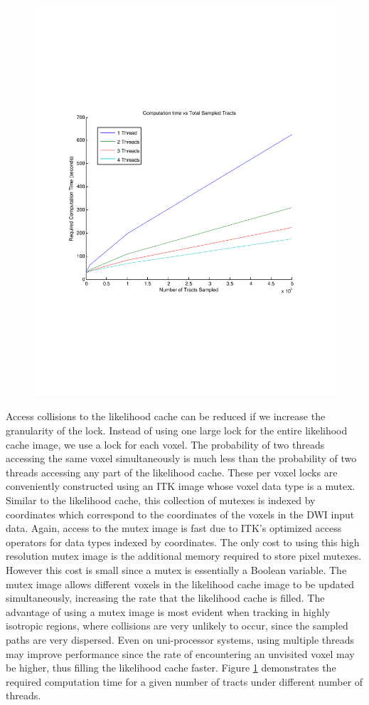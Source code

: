 \documentclass{InsightArticle}
\begin{document}
\begin{figure}
  \center
  \includegraphics[trim = 20mm 70mm 20mm 70mm, clip, width=0.75\linewidth]
	  {timepertracts}
	\label{fig:performance}
\end{figure}

Access collisions to the likelihood cache can be reduced if we increase the granularity of the lock.  Instead of using one large lock for the entire likelihood cache image, we use a lock for each voxel.  The probability of two threads accessing the same voxel simultaneously is much less than the probability of two threads accessing any part of the likelihood cache.  These per voxel locks are conveniently constructed using an ITK image whose voxel data type is a mutex.  Similar to the likelihood cache, this collection of mutexes is indexed by coordinates which correspond to the coordinates of the voxels in the DWI input data.  Again, access to the mutex image is fast due to ITK's optimized access operators for data types indexed by coordinates.  The only cost to using this high resolution mutex image is the additional memory required to store pixel mutexes.  However this cost is small since a mutex is essentially a Boolean variable.  The mutex image allows different voxels in the likelihood cache image to be updated simultaneously, increasing the rate that the likelihood cache is filled.  The advantage of using a mutex image is most evident when tracking in highly isotropic regions,  where collisions are very unlikely to occur, since the sampled paths are very dispersed.  Even on uni-processor systems, using multiple threads may improve performance since the rate of encountering an unvisited voxel may be higher, thus filling the likelihood cache faster. Figure \ref{fig:performance} demonstrates the required computation time for a given number of tracts under different number of threads.
\end{document}
